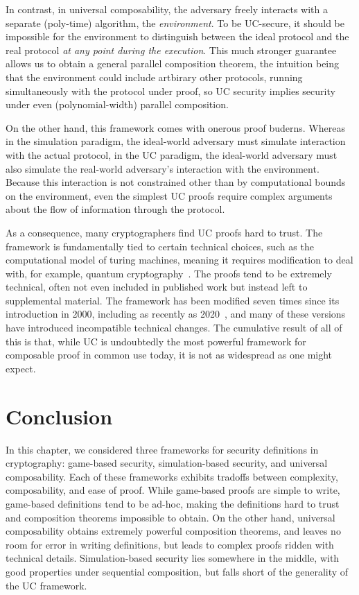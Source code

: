 In contrast, in universal composability, the adversary freely interacts with a
separate (poly-time) algorithm, the \emph{environment}. To be UC-secure, it
should be impossible for the environment to distinguish between the ideal
protocol and the real protocol \emph{at any point during the execution}. This
much stronger guarantee allows us to obtain a general parallel composition
theorem, the intuition being that the environment could include artbirary other
protocols, running simultaneously with the protocol under proof, so UC security
implies security under even (polynomial-width) parallel composition.

On the other hand, this framework comes with onerous proof buderns. Whereas in
the simulation paradigm, the ideal-world adversary must simulate interaction with
the actual protocol, in the UC paradigm, the ideal-world adversary must also
simulate the real-world adversary's interaction with the environment. Because
this interaction is not constrained other than by computational bounds on the
environment, even the simplest UC proofs require complex arguments about the
flow of information through the protocol.

As a consequence, many cryptographers find UC proofs hard to trust. The
framework is fundamentally tied to certain technical choices, such as the
computational model of turing machines, meaning it requires modification to
deal with, for example, quantum
cryptography~\cite{hofheinz-mullerquade-2003,unruh-2010}. The proofs tend to be
extremely technical, often not even included in published work but instead left
to supplemental material. The framework has been modified seven times since its
introduction in 2000, including as recently as 2020~\cite{canetti-2020}, and many of
these versions have introduced incompatible technical changes. The cumulative
result of all of this is that, while UC is undoubtedly the most powerful
framework for composable proof in common use today, it is not as widespread as
one might expect.

\section{Conclusion}

In this chapter, we considered three frameworks for security definitions in
cryptography: game-based security, simulation-based security, and universal
composability. Each of these frameworks exhibits tradoffs between complexity,
composability, and ease of proof. While game-based proofs are simple to write,
game-based definitions tend to be ad-hoc, making the definitions hard to trust
and composition theorems impossible to obtain. On the other hand, universal
composability obtains extremely powerful composition theorems, and leaves no
room for error in writing definitions, but leads to complex proofs ridden with
technical details. Simulation-based security lies somewhere in the middle, with
good properties under sequential composition, but falls short of the generality
of the UC framework.

